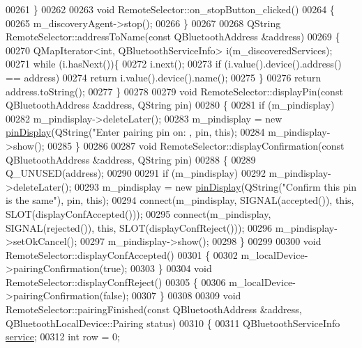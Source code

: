\begin{DoxyCode}
{00261 \}
00262 
00263 \textcolor{keywordtype}{void} RemoteSelector::on\_stopButton\_clicked()
00264 \{
00265     m\_discoveryAgent->stop();
00266 \}
00267 
00268 QString RemoteSelector::addressToName(\textcolor{keyword}{const} QBluetoothAddress &address)
00269 \{
00270     QMapIterator<int, QBluetoothServiceInfo> i(m\_discoveredServices);
00271     \textcolor{keywordflow}{while} (i.hasNext())\{
00272         i.next();
00273         \textcolor{keywordflow}{if} (i.value().device().address() == address)
00274             \textcolor{keywordflow}{return} i.value().device().name();
00275     \}
00276     \textcolor{keywordflow}{return} address.toString();
00277 \}
00278 
00279 \textcolor{keywordtype}{void} RemoteSelector::displayPin(\textcolor{keyword}{const} QBluetoothAddress &address, QString pin)
00280 \{
00281     \textcolor{keywordflow}{if} (m\_pindisplay)
00282         m\_pindisplay->deleteLater();
00283     m\_pindisplay = \textcolor{keyword}{new} \hyperlink{classpinDisplay}{pinDisplay}(QString(\textcolor{stringliteral}{"Enter pairing pin on: %
      , pin, \textcolor{keyword}{this});
00284     m\_pindisplay->show();
00285 \}
00286 
00287 \textcolor{keywordtype}{void} RemoteSelector::displayConfirmation(\textcolor{keyword}{const} QBluetoothAddress &address, QString pin)
00288 \{
00289     Q\_UNUSED(address);
00290 
00291     \textcolor{keywordflow}{if} (m\_pindisplay)
00292         m\_pindisplay->deleteLater();
00293     m\_pindisplay = \textcolor{keyword}{new} \hyperlink{classpinDisplay}{pinDisplay}(QString(\textcolor{stringliteral}{"Confirm this pin is the same"}), pin, \textcolor{keyword}{this});
00294     connect(m\_pindisplay, SIGNAL(accepted()), \textcolor{keyword}{this}, SLOT(displayConfAccepted()));
00295     connect(m\_pindisplay, SIGNAL(rejected()), \textcolor{keyword}{this}, SLOT(displayConfReject()));
00296     m\_pindisplay->setOkCancel();
00297     m\_pindisplay->show();
00298 \}
00299 
00300 \textcolor{keywordtype}{void} RemoteSelector::displayConfAccepted()
00301 \{
00302     m\_localDevice->pairingConfirmation(\textcolor{keyword}{true});
00303 \}
00304 \textcolor{keywordtype}{void} RemoteSelector::displayConfReject()
00305 \{
00306     m\_localDevice->pairingConfirmation(\textcolor{keyword}{false});
00307 \}
00308 
00309 \textcolor{keywordtype}{void} RemoteSelector::pairingFinished(\textcolor{keyword}{const} QBluetoothAddress &address, QBluetoothLocalDevice::Pairing 
      status)
00310 \{
00311     QBluetoothServiceInfo \hyperlink{classRemoteSelector_ada5543d127d62eb91591d4d11294b8b2}{service};
00312     \textcolor{keywordtype}{int} row = 0;
}}
\end{DoxyCode}
